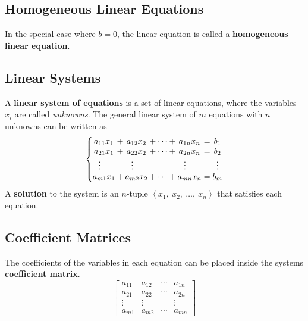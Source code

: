 \documentclass{article}
\begin{document}
\subsection{Homogeneous Linear Equations}
\begin{definition}
    In the special case where \(b=0\), the linear equation is called a
    \textbf{homogeneous linear equation}.
\end{definition}
\subsection{Linear Systems}
\begin{definition}
    A \textbf{linear system of equations} is a set of linear equations,
    where the variables \(x_i\) are called \textit{unknowns}. The
    general linear system of \(m\) equations with \(n\) unknowns can be
    written as
    \begin{equation*}
        \left\{
        \setlength\arraycolsep{0pt}
        \begin{array}{ c >{{}}c<{{}} c >{{}}c<{{}} c >{{}}c<{{}} c >{{}}c<{{}} c }
            a_{11}x_1                         & + & a_{12}x_2                         & + & \cdots & + & a_{1n}x_n                         & = & b_1    \\
            a_{21}x_1                         & + & a_{22}x_2                         & + & \cdots & + & a_{2n}x_n                         & = & b_2    \\
            \vdotswithin{a_{31}}\phantom{x_1} &   & \vdotswithin{a_{32}}\phantom{x_2} &   &        &   & \vdotswithin{a_{3n}}\phantom{x_n} &   & \vdots \\
            a_{m1}x_1                         & + & a_{m2}x_2                         & + & \cdots & + & a_{mn}x_n                         & = & b_m
        \end{array}
        \right.
    \end{equation*}
    A \textbf{solution} to the system is an \(n\)-tuple
    \(\left\langle x_1,\: x_2,\:\dots,\:x_n\right\rangle\) that
    satisfies each equation.
\end{definition}
\subsection{Coefficient Matrices}
\begin{definition}
    The coefficients of the variables in each equation can be placed
    inside the systems \textbf{coefficient matrix}.
    \begin{equation*}
        \begin{bmatrix}
            a_{11} & a_{12} & \cdots & a_{1n} \\
            a_{21} & a_{22} & \cdots & a_{2n} \\
            \vdots & \vdots &        & \vdots \\
            a_{m1} & a_{m2} & \cdots & a_{mn}
        \end{bmatrix}
    \end{equation*}
\end{definition}
\end{document}
